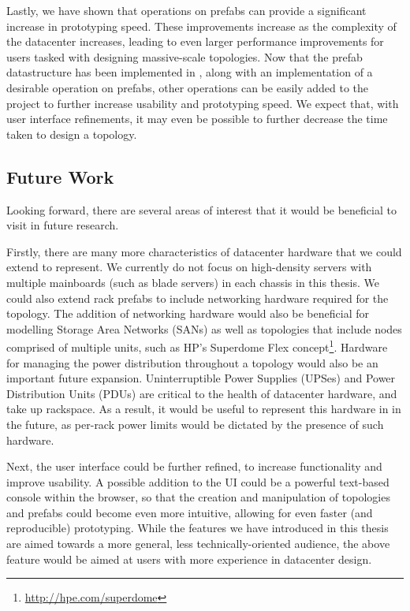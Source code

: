 \documentclass[11pt]{article}
\begin{document}
		Lastly, we have shown that operations on prefabs can provide a significant increase in prototyping speed.
		These improvements increase as the complexity of the datacenter increases, leading to even larger performance improvements for users tasked with designing massive-scale topologies.
		Now that the prefab datastructure has been implemented in \opendc{}, along with an implementation of a desirable operation on prefabs, other operations can be easily added to the project to further increase usability and prototyping speed.
		We expect that, with user interface refinements, it may even be possible to further decrease the time taken to design a topology.


	\subsection{Future Work} \label{sec:future-work}
		Looking forward, there are several areas of interest that it would be beneficial to visit in future research.

		Firstly, there are many more characteristics of datacenter hardware that we could extend \opendc{} to represent. 
		We currently do not focus on high-density servers with multiple mainboards (such as blade servers) in each chassis in this thesis. 
		We could also extend rack prefabs to include networking hardware required for the topology. 
		The addition of networking hardware would also be beneficial for modelling Storage Area Networks (SANs) as well as topologies that include nodes comprised of multiple units, such as HP's Superdome Flex concept\footnote{\url{http://hpe.com/superdome}}.
		Hardware for managing the power distribution throughout a topology would also be an important future expansion.
		Uninterruptible Power Supplies (UPSes) and Power Distribution Units (PDUs) are critical to the health of datacenter hardware, and take up rackspace.
		As a result, it would be useful to represent this hardware in \opendc{} in the future, as per-rack power limits would be dictated by the presence of such hardware.

		Next, the \opendc{} user interface could be further refined, to increase functionality and improve usability.
		A possible addition to the UI could be a powerful text-based console within the browser, so that the creation and manipulation of topologies and prefabs could become even more intuitive, allowing for even faster (and reproducible) prototyping.
		While the features we have introduced in this thesis are aimed towards a more general, less technically-oriented audience, the above feature would be aimed at users with more experience in datacenter design.
\end{document}
